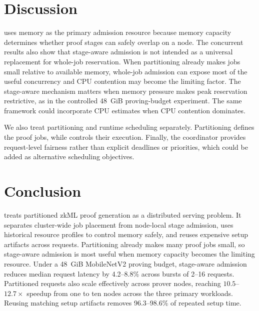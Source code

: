 \section{Discussion}
\label{sec:discussion}
\TITLE{} uses memory as the primary admission resource because memory capacity
determines whether proof stages can safely overlap on a node. The concurrent
results also show that stage-aware admission is not intended as a universal
replacement for whole-job reservation. When partitioning already makes jobs
small relative to available memory, whole-job admission can expose most of the
useful concurrency and CPU contention may become the limiting factor. The
stage-aware mechanism matters when memory pressure makes peak reservation
restrictive, as in the controlled 48~GiB proving-budget experiment. The same framework could
incorporate CPU estimates when CPU contention dominates.

We also treat partitioning and runtime scheduling separately. Partitioning defines
the proof jobs, while \TITLE{} controls their execution. Finally, the
coordinator provides request-level fairness rather than explicit deadlines or
priorities, which could be added as alternative scheduling objectives.

\section{Conclusion}
\TITLE{} treats partitioned zkML proof generation as a distributed serving
problem. It separates cluster-wide job placement from node-local stage
admission, uses historical resource profiles to control memory safely, and
reuses expensive setup artifacts across requests. Partitioning already makes
many proof jobs small, so stage-aware admission is most useful when memory
capacity becomes the limiting resource. Under a 48~GiB MobileNetV2 proving
budget, stage-aware admission reduces median request latency by 4.2--8.8\%
across bursts of 2--16 requests. Partitioned requests also scale effectively
across prover nodes, reaching \(10.5\)--\(12.7\times\) speedup from one to ten
nodes across the three primary workloads. Reusing matching setup artifacts
removes 96.3--98.6\% of repeated setup time.
